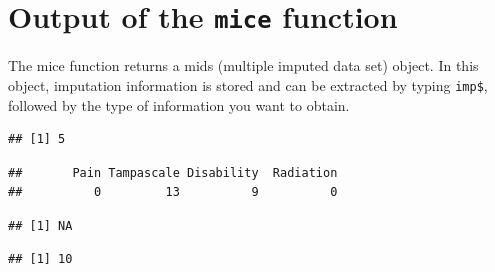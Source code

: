 \documentclass[]{book}
\newenvironment{Shaded}{\begin{snugshade}}{\end{snugshade}}
\newcommand{\OperatorTok}[1]{\textcolor[rgb]{0.81,0.36,0.00}{\textbf{#1}}}
\newcommand{\NormalTok}[1]{#1}
\begin{document}
\section{\texorpdfstring{Output of the \texttt{mice}
function}{Output of the mice function}}\label{output-of-the-mice-function}

The mice function returns a mids (multiple imputed data set) object. In
this object, imputation information is stored and can be extracted by
typing \texttt{imp\$}, followed by the type of information you want to
obtain.

\begin{Shaded}
\end{Shaded}

\begin{verbatim}
## [1] 5
\end{verbatim}

\begin{Shaded}
\end{Shaded}

\begin{verbatim}
##       Pain Tampascale Disability  Radiation 
##          0         13          9          0
\end{verbatim}

\begin{Shaded}
\end{Shaded}

\begin{verbatim}
## [1] NA
\end{verbatim}

\begin{Shaded}
\end{Shaded}

\begin{verbatim}
## [1] 10
\end{verbatim}
\end{document}
